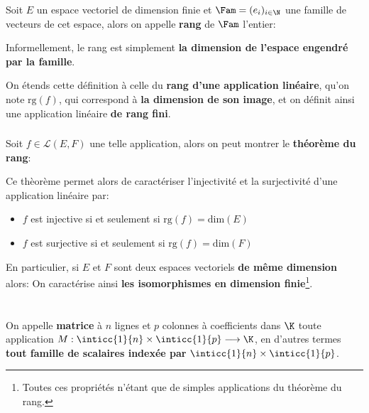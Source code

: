 Soit \(E\) un espace vectoriel de dimension finie et \(\Fam = (e_i)_{i \in \N}\) une famille de vecteurs de cet espace, alors on appelle \textbf{rang} de \(\Fam\) l'entier:

Informellement, le rang est simplement \textbf{la dimension de l'espace engendré par la famille}.\<

On étends cette définition à celle du \textbf{rang d'une application linéaire}, qu'on note \(\text{rg}(f)\), qui correspond à \textbf{la dimension de son image}, et on définit ainsi une application linéaire \textbf{de rang fini}.

\subsection*{}

Soit \(f \in \mathcal{L}(E, F)\) une telle application, alors on peut montrer le \textbf{théorème du rang}:

Ce thèorème permet alors de caractériser l'injectivité et la surjectivité d'une application linéaire par:
\begin{itemize}
   \item \(f\) est injective si et seulement si \(\text{rg}(f) = \text{dim}(E)\)
   \item \(f\) est surjective si et seulement si \(\text{rg}(f) = \text{dim}(F)\)
\end{itemize}

En particulier, si \(E\) et \(F\) sont deux espaces vectoriels \textbf{de même dimension} alors:
On caractérise ainsi \textbf{les isomorphismes en dimension finie}\footnote[2]{Toutes ces propriétés n'étant que de simples applications du théorème du rang.}.
\chapter*{} %

On appelle \textbf{matrice} à \(n\) lignes et \(p\) colonnes à coefficients dans \(\K\) toute application \(M : \inticc{1}{n} \times \inticc{1}{p} \longrightarrow \K\), en d'autres termes \textbf{tout famille de scalaires indexée par }\(\inticc{1}{n} \times \inticc{1}{p}\).\<

